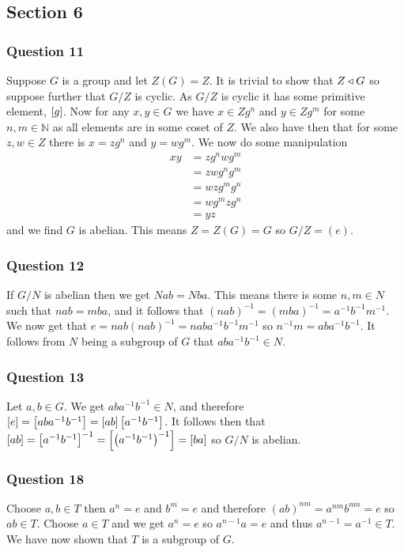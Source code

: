 \documentclass{article}
\begin{document}
\subsection{Section 6}
\subsubsection{Question 11}
Suppose $G$ is a group and let $Z(G) = Z$. It is trivial to show that $Z \triangleleft G$ so suppose further that $G/Z$ is cyclic. As $G/Z$ is cyclic it has some primitive element, $\left[{g}\right]$. Now for any $x,y \in G$ we have $x \in Zg^n$ and $y \in Zg^m$ for some $n,m\in\mathbb N$ as all elements are in some coset of $Z$. We also have then that for some $z,w \in Z$ there is $x = zg^n$ and $y = wg^m$. We now do some manipulation
\begin{align*}
xy &= zg^nwg^m \\
&= zwg^ng^m \\
&= wzg^mg^n \\
&= wg^mzg^n \\
&= yz
\end{align*}
and we find $G$ is abelian. This means $Z = Z(G) = G$ so $G/Z = (e)$.

\subsubsection{Question 12}
If $G/N$ is abelian then we get $Nab = Nba$. This means there is some $n,m \in N$ such that $nab = mba$, and it follows that $(nab)^{-1} = (mba)^{-1} = a^{-1}b^{-1}m^{-1}$. We now get that $e = nab(nab)^{-1} = naba^{-1}b^{-1}m^{-1}$ so $n^{-1}m = aba^{-1}b^{-1}$. It follows from $N$ being a subgroup of $G$ that $aba^{-1}b^{-1} \in N$.

\subsubsection{Question 13}
Let $a,b\in G$. We get $aba^{-1}b^{-1}\in N$, and therefore $\left[{e}\right] = \left[{aba^{-1}b^{-1}}\right] = \left[{ab}\right]\left[{a^{-1}b^{-1}}\right]$. It follows then that $\left[{ab}\right] = \left[{a^{-1}b^{-1}}\right]^{-1} = \left[{\left(a^{-1}b^{-1}\right)^{-1}}\right] = \left[{ba}\right]$ so $G / N$ is abelian.

\subsubsection{Question 18}
Choose $a,b\in T$ then $a^n = e$ and $b^m = e$ and therefore $(ab)^{nm} = a^{nm}b^{nm} = e$ so $ab \in T$. Choose $a \in T$ and we get $a^n = e$ so $a^{n-1}a = e$ and thus $a^{n-1} = a^{-1} \in T$. We have now shown that $T$ is a subgroup of $G$.
\end{document}
